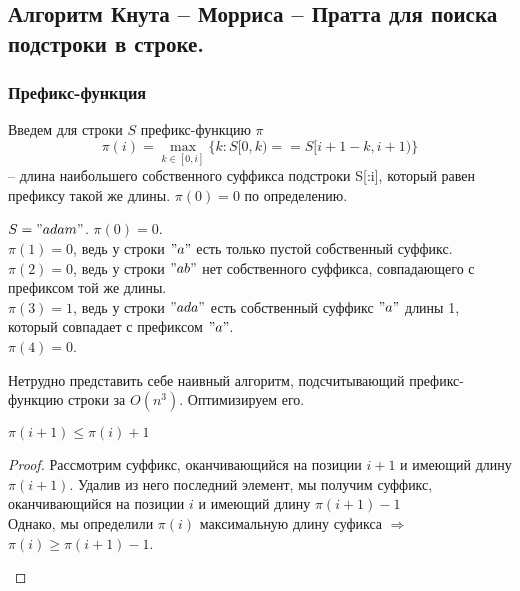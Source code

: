 \subsection{Алгоритм Кнута -- Морриса -- Пратта для поиска подстроки в строке.}%

\subsubsection{Префикс-функция}
Введем для строки $S$ префикс-функцию $\pi$ 
\[
	\pi(i) = \max \limits_{k \in [0, i]} \{k: S[0, k) == S[i + 1 - k, i +1)\}
\]
-- длина наибольшего собственного суффикса подстроки S[:i], который равен префиксу такой же длины. $\pi(0) = 0$ по определению.

\begin{example}
	$S = "adam"$. 
	$\pi(0) = 0$. \\
	$\pi(1) = 0$, ведь у строки  $"a"$ есть только пустой собственный суффикс. \\
	$\pi(2) = 0$, ведь у строки $"ab"$ нет собственного суффикса, совпадающего с префиксом той же длины. \\
	$\pi(3) = 1$, ведь у строки  $"ada"$ есть собственный суффикс  $"a"$ длины 1, который совпадает с префиксом  $"a"$. \\
	$\pi(4) = 0$. \\
\end{example}

Нетрудно представить себе наивный алгоритм, подсчитывающий префикс-функцию строки за $O(n^3)$. Оптимизируем его.



 \begin{prop}
	 $\pi(i + 1) \leq \pi(i) + 1$
\end{prop}
\begin{proof}
	Рассмотрим суффикс, оканчивающийся на позиции $i + 1$ и имеющий длину $\pi(i + 1)$. Удалив из него последний элемент, мы получим суффикс, оканчивающийся на позиции $i$ и имеющий длину  $\pi(i + 1) - 1$\\
	Однако, мы определили $\pi(i)$ максимальную длину суфикса  $\Rightarrow$ $\pi(i) \geq \pi(i + 1) - 1$.
	\begin{center}
	\end{center}
\end{proof}

